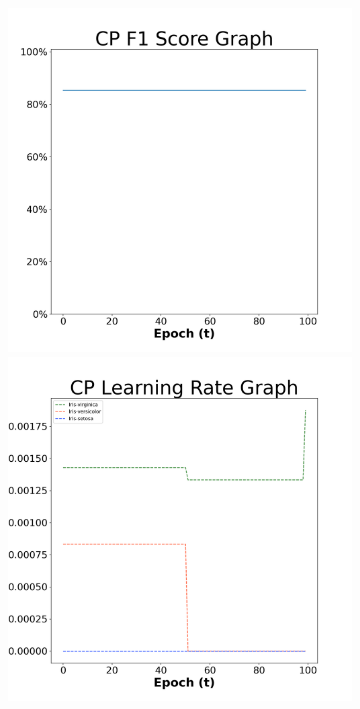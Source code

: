 \begin{figure}[H]
    \centering %
\begin{subfigure}{0.3\textwidth}
  \includegraphics[width=\linewidth]{images/exper2/iris/CP_0.01_f1.png}
    \includegraphics[width=\linewidth]{images/exper2/iris/CP_0.01_lr.png}

\end{subfigure}
\end{figure}

